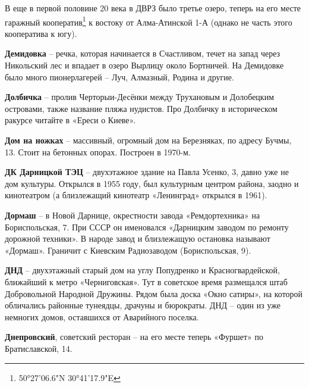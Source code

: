 В еще в первой половине 20 века в ДВРЗ было третье озеро, теперь на его месте гаражный кооператив\footnote{50°27'06.6"N 30°41'17.9"E} к востоку от Алма-Атинской 1-А (однако не часть этого кооператива к югу).\\

\medskip

\textbf{Демидовка} – речка, которая начинается в Счастливом, течет на запад через Никольский лес и впадает в озеро Вырлицу около Бортничей. На Демидовке было много пионерлагерей – Луч, Алмазный, Родина и другие.\\

\medskip

\textbf{Долбичка} – пролив Черторыи-Десёнки между Трухановым и Долобецким островами, также название пляжа нудистов. Про Долбичку в историческом ракурсе читайте в «Ереси о Киеве».\\

\medskip

\textbf{Дом на ножках} – массивный, огромный дом на Березняках, по адресу Бучмы, 13. Стоит на бетонных опорах. Построен в 1970-м.\\

\medskip

\textbf{ДК Дарницкой ТЭЦ} – двухэтажное здание на Павла Усенко, 3, давно уже не дом культуры. Открылся в 1955 году, был культурным центром района, заодно и кинотеатром (а близлежащий кинотеатр «Ленинград» открылся в 1961).\\ 

\medskip

\textbf{Дормаш} – в Новой Дарнице, окрестности завода «Ремдортехника» на Бориспольская, 7. При СССР он именовался «Дарницким заводом по ремонту дорожной техники». В народе завод и близлежащую остановка называют «Дормаш». Граничит с Киевским Радиозаводом (Бориспольская, 9).\\

\medskip

\textbf{ДНД} – двухэтажный старый дом на углу Попудренко и Красногвардейской, ближайший к метро «Черниговская». Тут в советское время размещался штаб Добровольной Народной Дружины. Рядом была доска «Окно сатиры», на которой обличались районные тунеядцы, драчуны и бюрократы. ДНД – один из уже немногих домов, оставшихся от Аварийного поселка.\\

\medskip

\textbf{Днепровский}, советский ресторан – на его месте теперь «Фуршет» по Братиславской, 14.\\

